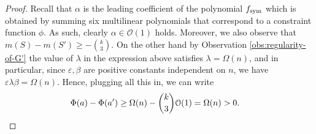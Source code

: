 \documentclass[a4paper,UKenglish,cleveref, autoref, thm-restate,numberwithinsect]{lipics-v2021}
\newcommand{\bigO}{\mathcal{O}}
\newcommand{\fsym}{f_{\rm sym}}
\begin{document}
\begin{proof}
    Recall that $\alpha$ is the leading coefficient of the polynomial $\fsym$ which is obtained by summing six multilinear polynomials that correspond to a constraint function $\phi$. As such, clearly $\alpha\in \bigO(1)$ holds. Moreover, we also observe that $m(S)-m(S')\geq -\binom{k}{3}$. On the other hand by
Observation \ref{obs:regularity-of-G'}
    the value of $\lambda$ in the expression above satisfies $\lambda = \Omega(n)$, and in particular, since $\varepsilon, \beta$ are positive constants independent on $n$, we have $\varepsilon\lambda\beta = \Omega(n)$.
    Hence, plugging all this in, we can write
    \begin{align*}
        \Phi(a)-\Phi(a') &\ge \Omega(n) - \binom{k}{3}\bigO(1) = \Omega(n)>0. \qedhere
    \end{align*}
\end{proof}
\end{document}
